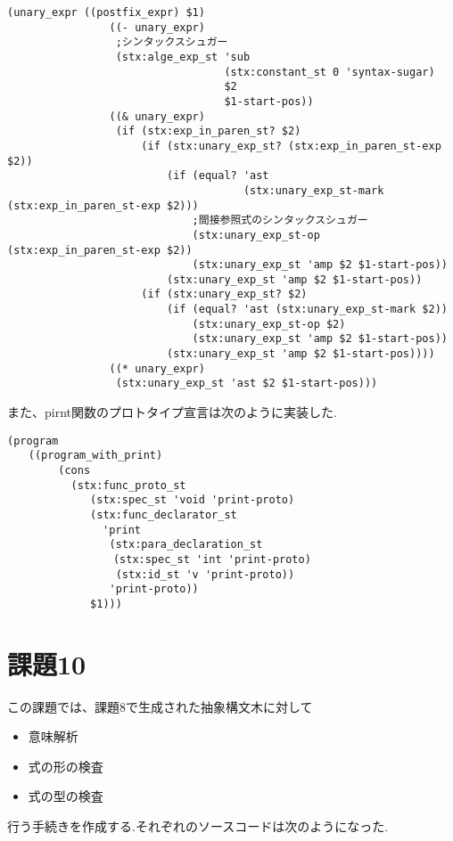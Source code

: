 \documentclass[a4j,dvipdfmx]{jarticle}
\begin{document}
\begin{lstlisting}
(unary_expr ((postfix_expr) $1)
                ((- unary_expr)
                 ;シンタックスシュガー
                 (stx:alge_exp_st 'sub 
                                  (stx:constant_st 0 'syntax-sugar) 
                                  $2 
                                  $1-start-pos))
                ((& unary_expr)
                 (if (stx:exp_in_paren_st? $2) 
                     (if (stx:unary_exp_st? (stx:exp_in_paren_st-exp $2)) 
                         (if (equal? 'ast 
                                     (stx:unary_exp_st-mark (stx:exp_in_paren_st-exp $2)))
                             ;間接参照式のシンタックスシュガー
                             (stx:unary_exp_st-op (stx:exp_in_paren_st-exp $2))
                             (stx:unary_exp_st 'amp $2 $1-start-pos))
                         (stx:unary_exp_st 'amp $2 $1-start-pos))
                     (if (stx:unary_exp_st? $2)
                         (if (equal? 'ast (stx:unary_exp_st-mark $2)) 
                             (stx:unary_exp_st-op $2) 
                             (stx:unary_exp_st 'amp $2 $1-start-pos))
                         (stx:unary_exp_st 'amp $2 $1-start-pos))))
                ((* unary_expr)
                 (stx:unary_exp_st 'ast $2 $1-start-pos)))
\end{lstlisting}
また、pirnt関数のプロトタイプ宣言は次のように実装した.
\begin{lstlisting}[caption=print関数のプロトタイプ]
(program 
　　((program_with_print) 
        (cons 
          (stx:func_proto_st
             (stx:spec_st 'void 'print-proto)
             (stx:func_declarator_st 
　　　　　　　　　'print 
                (stx:para_declaration_st 
　　　　　　　　　　(stx:spec_st 'int 'print-proto) 
                 (stx:id_st 'v 'print-proto))
                'print-proto)) 
             $1)))
\end{lstlisting}
\section{課題10}
この課題では、課題8で生成された抽象構文木に対して
\begin{itemize}
\item 意味解析
\item 式の形の検査
\item 式の型の検査
\end{itemize}
行う手続きを作成する.それぞれのソースコードは次のようになった.




\end{document}
